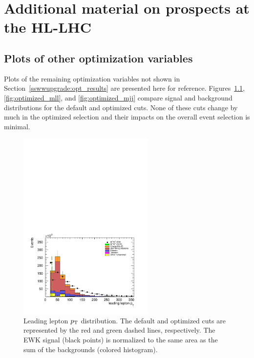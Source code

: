 \chapter{Additional material on \ssww prospects at the HL-LHC}\label{app:sswwupgrade_additional_material}


\FloatBarrier

\section{Plots of other optimization variables}\label{app:sswwupgrade_optimization_plots}
Plots of the remaining optimization variables not shown in Section~\ref{sswwupgrade:opt_results} are presented here for reference.
Figures~\ref{fig:optimized_lep0pt}, \ref{fig:optimized_mll}, and \ref{fig:optimized_mjj} compare signal and background distributions for the default and optimized cuts.
None of these cuts change by much in the optimized selection and their impacts on the overall event selection is minimal.

\begin{figure}[htp]
  \centering
  \includegraphics[width=0.6\textwidth]{figs/ssww_upgrade/optimization_plots/lep0pt}
  \caption{Leading lepton $p_{\mathrm{T}}$ distribution.  The default and optimized cuts are represented by the red and green dashed lines, respectively.  The \ssww EWK signal (black points) is normalized to the same area as the sum of the backgrounds (colored histogram).}
  \label{fig:optimized_lep0pt}
\end{figure}

